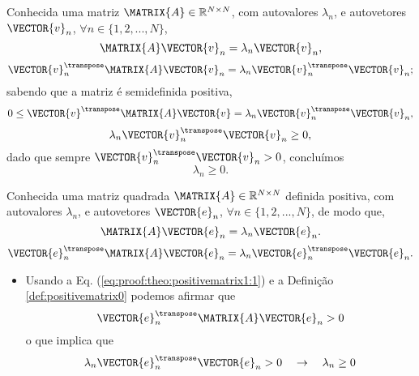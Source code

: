 \begin{myproofT}\label{proof:theo:semipositivematrix2}
Conhecida uma matriz $\MATRIX{A} \in \mathbb{R}^{N \times N}$, com  autovalores $\lambda_n$,
e autovetores $\VECTOR{v}_n$, $\forall n \in \{1, 2, ..., N\}$,
\begin{equation}
\MATRIX{A}\VECTOR{v}_n = \lambda_n \VECTOR{v}_n, 
\end{equation}
\begin{equation}
\VECTOR{v}_n^{\transpose}\MATRIX{A}\VECTOR{v}_n = \lambda_n \VECTOR{v}_n^{\transpose}\VECTOR{v}_n;
\end{equation}
sabendo que a matriz é semidefinida positiva,
\begin{equation}
0 \leq \VECTOR{v}^{\transpose}\MATRIX{A}\VECTOR{v} = \lambda_n \VECTOR{v}_n^{\transpose}\VECTOR{v}_n,
\end{equation}
\begin{equation}
\lambda_n \VECTOR{v}_n^{\transpose}\VECTOR{v}_n \geq 0,
\end{equation}
dado que sempre $\VECTOR{v}_n^{\transpose}\VECTOR{v}_n> 0$, concluímos
\begin{equation}
\lambda_n  \geq 0.
\end{equation} 
\end{myproofT}

\begin{myproofT}\label{proof:theo:positivematrix1}
Conhecida uma matriz quadrada $\MATRIX{A} \in \mathbb{R}^{N \times N}$ definida positiva, com  autovalores $\lambda_n$,
e autovetores $\VECTOR{e}_n$, $\forall n \in \{1, 2, ..., N\}$, de modo que,
\begin{equation}\label{eq:proof:theo:positivematrix1:0}
\MATRIX{A}\VECTOR{e}_n=\lambda_n \VECTOR{e}_n.
\end{equation}
\begin{equation}\label{eq:proof:theo:positivematrix1:1}
\VECTOR{e}_n^{\transpose}\MATRIX{A}\VECTOR{e}_n=\lambda_n \VECTOR{e}_n^{\transpose}\VECTOR{e}_n.
\end{equation}

\begin{itemize}
\item Usando a Eq. (\ref{eq:proof:theo:positivematrix1:1}) e a Definição \ref{def:positivematrix0} podemos afirmar que
\begin{equation}
\VECTOR{e}_n^{\transpose}\MATRIX{A}\VECTOR{e}_n >0
\end{equation} 
o que implica que
\begin{equation}
\lambda_n \VECTOR{e}_n^{\transpose}\VECTOR{e}_n > 0
\quad \rightarrow \quad
\lambda_n  \geq 0
\end{equation} 
\end{itemize}
\end{myproofT}



